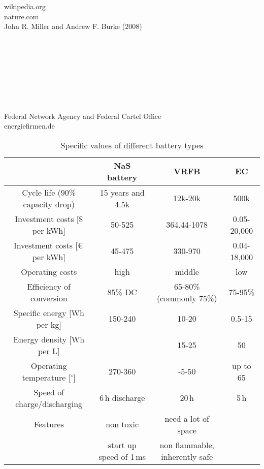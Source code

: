\begin{parcolumns}[colwidths={1=2.5 cm, 2=10 cm, 3=2.5cm}]{3}
{\\ \\ \\ \\ \\ \\ \\ \\ \\ \\ \\ \\ \\ \\ \\ \\ \\ \\ \\ \\ \\ \\ \\ \\  wikipedia.org\\nature.com \\ John R. Miller and Andrew F. Burke (2008)\\
\\ \\ \\ \\\\ \\  \\ \\  Federal Network Agency and Federal Cartel Office \\energiefirmen.de
}

\end{parcolumns}
\begin{table}[H]
\centering
\caption{Specific values of different battery types}
\begin{tabular}{cccc}
\toprule
& NaS battery & VRFB & EC\\
\midrule
Cycle life (90\% capacity drop) & 15 years and 4.5k&12k-20k& 500k\\
Investment costs [\$ per kWh] & 50-525 & 364.44-1078&0.05-20,000\\
Investment costs [\euro \,per kWh]& 45-475 & 330-970& 0.04-18,000\\
Operating costs& high & middle & low\\
Efficiency of conversion & 85\% DC & 65-80\% (commonly 75\%) & 75-95\%\\
Specific energy [Wh per kg] & 150-240 & 10-20&0.5-15\\
Energy density [Wh per L] & & 15-25& 50\\
Operating temperature [$^\circ$]& 270-360& -5-50& up to 65 \\ 
Speed of charge/discharging &6\,h discharge &20\,h&5\,h\\
Features& non toxic & need a lot of space & \\
&start up speed of 1\,ms& non flammable, inherently safe &\\
\bottomrule
\end{tabular}
\end{table}
